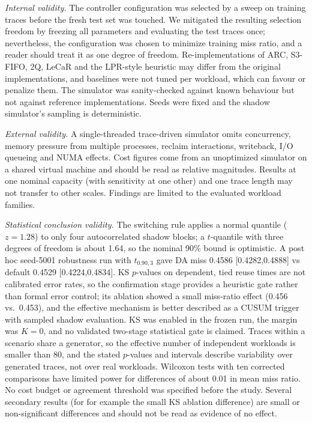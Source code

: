 \documentclass[journal,onecolumn]{IEEEtran}
\begin{document}
\emph{Internal validity.} The controller configuration was selected by a sweep
on training traces before the fresh test set was touched. We mitigated the
resulting selection freedom by freezing all parameters and evaluating the test
traces once; nevertheless, the configuration was chosen to minimize training
miss ratio, and a reader should treat it as one degree of freedom.
Re-implementations of ARC, S3-FIFO, 2Q, LeCaR and the LPR-style
heuristic may differ from the original implementations, and baselines were not
tuned per workload, which can favour or penalize them. The simulator was
sanity-checked against known behaviour but not against reference
implementations. Seeds were fixed and the shadow simulator's sampling is
deterministic.

\emph{External validity.} A single-threaded trace-driven simulator omits
concurrency, memory pressure from multiple processes, reclaim interactions,
writeback, I/O queueing and NUMA effects. Cost figures come from an
unoptimized simulator on a shared virtual machine and should be read as
relative magnitudes. Results at one nominal capacity (with sensitivity at one other) and one trace
length may not transfer to other scales. Findings are
limited to the evaluated workload families.

\emph{Statistical conclusion validity.} The switching rule applies a normal
quantile ($z = 1.28$) to only four autocorrelated shadow blocks; a
$t$-quantile with three degrees of freedom is about 1.64, so the nominal 90\%
bound is optimistic. A post hoc seed-5001 robustness run with
$t_{0.90,3}$ gave DA miss 0.4586 [0.4282,0.4888] vs default 0.4529
[0.4224,0.4834]. KS $p$-values on dependent, tied reuse times are not calibrated error rates,
so the confirmation stage provides a heuristic gate rather than formal error
control; its ablation showed a small miss-ratio effect (0.456 vs.\ 0.453), and
the effective mechanism is better described as a CUSUM trigger with sampled
shadow evaluation. KS was enabled in the frozen run, the margin was $K = 0$, and no
validated two-stage statistical gate is claimed. Traces within a scenario share a generator,
so the effective number of independent workloads is smaller than 80, and the
stated $p$-values and intervals describe variability over generated traces,
not over real workloads. Wilcoxon tests with ten corrected comparisons have
limited power for differences of about 0.01 in mean miss ratio. No cost budget or agreement threshold was specified before the study. Several secondary results (for
for example the small KS ablation difference) are small or non-significant
differences and should not be read as evidence of no effect.
\end{document}
